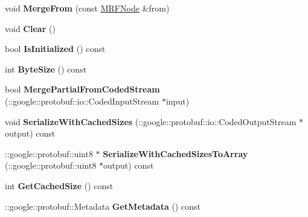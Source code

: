 \begin{DoxyCompactItemize}
\item 
\hypertarget{classgraph_1_1MRFNode_ac4758815f0eb1ccb68720627100fbeb5}{
void {\bfseries MergeFrom} (const \hyperlink{classgraph_1_1MRFNode}{MRFNode} \&from)}
\label{classgraph_1_1MRFNode_ac4758815f0eb1ccb68720627100fbeb5}

\item 
\hypertarget{classgraph_1_1MRFNode_a610d843b6af3c9943e096adae1c878b9}{
void {\bfseries Clear} ()}
\label{classgraph_1_1MRFNode_a610d843b6af3c9943e096adae1c878b9}

\item 
\hypertarget{classgraph_1_1MRFNode_a4ee069fb613a4c42ce0b46a092905989}{
bool {\bfseries IsInitialized} () const }
\label{classgraph_1_1MRFNode_a4ee069fb613a4c42ce0b46a092905989}

\item 
\hypertarget{classgraph_1_1MRFNode_ab4cddf5ea1745f095b447d80a7e317b8}{
int {\bfseries ByteSize} () const }
\label{classgraph_1_1MRFNode_ab4cddf5ea1745f095b447d80a7e317b8}

\item 
\hypertarget{classgraph_1_1MRFNode_a7d517e721e300ebe179ef71f53ee2665}{
bool {\bfseries MergePartialFromCodedStream} (::google::protobuf::io::CodedInputStream $\ast$input)}
\label{classgraph_1_1MRFNode_a7d517e721e300ebe179ef71f53ee2665}

\item 
\hypertarget{classgraph_1_1MRFNode_a7d0379969f1c04b3753f3af41fcdcd8d}{
void {\bfseries SerializeWithCachedSizes} (::google::protobuf::io::CodedOutputStream $\ast$output) const }
\label{classgraph_1_1MRFNode_a7d0379969f1c04b3753f3af41fcdcd8d}

\item 
\hypertarget{classgraph_1_1MRFNode_a3c686681d6b3afada8c8119bc167946f}{
::google::protobuf::uint8 $\ast$ {\bfseries SerializeWithCachedSizesToArray} (::google::protobuf::uint8 $\ast$output) const }
\label{classgraph_1_1MRFNode_a3c686681d6b3afada8c8119bc167946f}

\item 
\hypertarget{classgraph_1_1MRFNode_a420b833847841bcbcbbe9baf10d42876}{
int {\bfseries GetCachedSize} () const }
\label{classgraph_1_1MRFNode_a420b833847841bcbcbbe9baf10d42876}

\item 
\hypertarget{classgraph_1_1MRFNode_ad18331d6dffc4a9477fdba263cf9f2fe}{
::google::protobuf::Metadata {\bfseries GetMetadata} () const }
\label{classgraph_1_1MRFNode_ad18331d6dffc4a9477fdba263cf9f2fe}


\end{DoxyCompactItemize}
